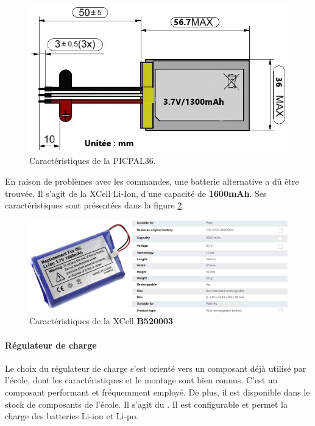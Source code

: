 \clearpage

\begin{figure}[!h]
	\centering
	\includegraphics[width=.8\linewidth]{../figures/pre_etude/batt}
	\caption{Caractéristiques de la PICPAL36.}
	\label{fig:batt}
\end{figure}

En raison de problèmes avec les commandes, une batterie alternative a dû être trouvée. Il s'agit de la XCell  Li-Ion, d'une capacité de \textbf{1600mAh}. Ses caractéristiques sont présentées dans la figure \ref{fig:batt2}.

\begin{figure}[h]
	\centering
	\includegraphics[width=.8\linewidth]{../figures/pre_etude/batt2}
	\caption{Caractéristiques de la XCell \textbf{B520003}}
	\label{fig:batt2}
\end{figure}



\paragraph{Régulateur de charge} Le choix du régulateur de charge s'est orienté vers un composant déjà utilisé par l'école, dont les caractéristiques et le montage sont bien connus. C'est un composant performant et fréquemment employé. De plus, il est disponible dans le stock de composants de l'école. Il s'agit du . Il est configurable et permet la charge des batteries Li-ion et Li-po.

